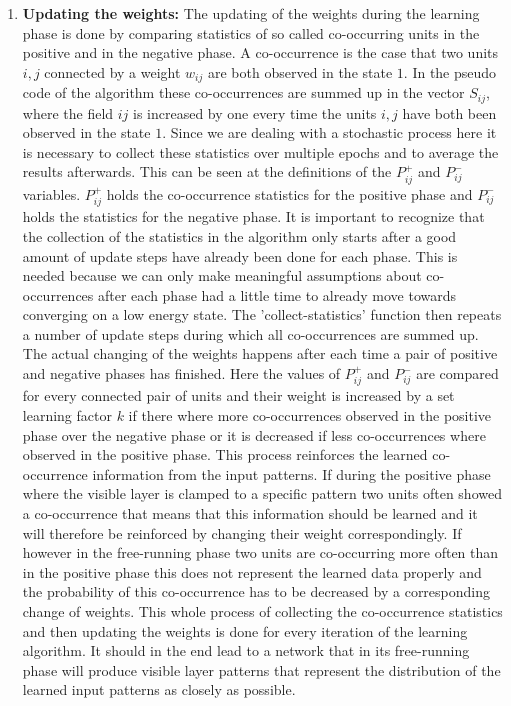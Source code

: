 \documentclass[12pt,twoside]{article}
\theoremstyle{plain}
\theoremstyle{definition}
\theoremstyle{remark}
\begin{document}
\begin{enumerate}
    \item \textbf{Updating the weights:}\newline
        The updating of the weights during the learning phase is done by comparing statistics of so called co-occurring units in the positive
        and in the negative phase. A co-occurrence is the case that two units $i,j$ connected by a weight $w_{ij}$ are both observed in the
        state $1$. In the pseudo code of the algorithm these co-occurrences are summed up in the vector $S_{ij}$, where the field $ij$ is increased
        by one every time the units $i,j$ have both been observed in the state $1$.
        Since we are dealing with a stochastic process here it is necessary to collect these statistics over multiple epochs and to average
        the results afterwards. This can be seen at the definitions of the $P^+_{ij}$ and $P^-_{ij}$ variables.\newline
        $P^+_{ij}$ holds the co-occurrence statistics for the positive phase and $P^-_{ij}$ holds the statistics for the negative phase.
        It is important to recognize that the collection of the statistics in the algorithm only starts after a good amount of 
        update steps have already been done for each phase. This is needed because we can only make meaningful assumptions about 
        co-occurrences after each phase had a little time to already move towards converging on a low energy state.
        The 'collect-statistics' function then repeats a number of update steps during which all co-occurrences are summed up.\newline
        The actual changing of the weights happens after each time a pair of positive and negative phases has finished.
        Here the values of $P^+_{ij}$ and $P^-_{ij}$ are compared for every connected pair of units and their weight
        is increased by a set learning factor $k$ if there where more co-occurrences observed in the positive phase over the negative phase
        or it is decreased if less co-occurrences where observed in the positive phase. This process reinforces the learned co-occurrence 
        information from the input patterns. If during the positive phase where the visible layer is clamped to a specific pattern
        two units often showed a co-occurrence that means that this information should be learned and it will therefore
        be reinforced by changing their weight correspondingly. If however in the free-running phase two units
        are co-occurring more often than in the positive phase this does not represent the learned data properly and
        the probability of this co-occurrence has to be decreased by a corresponding change of weights.\newline
        This whole process of collecting the co-occurrence statistics and then updating the weights is done for
        every iteration of the learning algorithm. It should in the end lead to a network that in its free-running
        phase will produce visible layer patterns that represent the distribution of the learned input patterns
        as closely as possible.

\end{enumerate}
\end{document}
